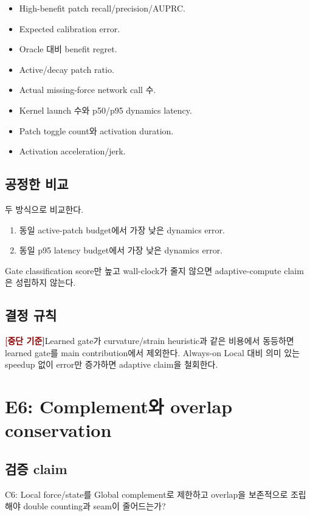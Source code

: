 \documentclass[11pt,a4paper]{article}
\newcommand{\killgate}{\textcolor{darkred}{\textbf{[중단 기준]}}}
\begin{document}
\begin{itemize}[leftmargin=1.5em]
  \item High-benefit patch recall/precision/AUPRC.
  \item Expected calibration error.
  \item Oracle 대비 benefit regret.
  \item Active/decay patch ratio.
  \item Actual missing-force network call 수.
  \item Kernel launch 수와 p50/p95 dynamics latency.
  \item Patch toggle count와 activation duration.
  \item Activation acceleration/jerk.
\end{itemize}

\subsection*{공정한 비교}

두 방식으로 비교한다.

\begin{enumerate}[leftmargin=1.7em]
  \item 동일 active-patch budget에서 가장 낮은 dynamics error.
  \item 동일 p95 latency budget에서 가장 낮은 dynamics error.
\end{enumerate}

Gate classification score만 높고 wall-clock가 줄지 않으면 adaptive-compute claim은 성립하지 않는다.

\subsection*{결정 규칙}

\killgate Learned gate가 curvature/strain heuristic과 같은 비용에서 동등하면
learned gate를 main contribution에서 제외한다.
Always-on Local 대비 의미 있는 speedup 없이 error만 증가하면 adaptive claim을 철회한다.

\section{E6: Complement와 overlap conservation}

\subsection*{검증 claim}

C6: Local force/state를 Global complement로 제한하고
overlap을 보존적으로 조립해야 double counting과 seam이 줄어드는가?
\end{document}
